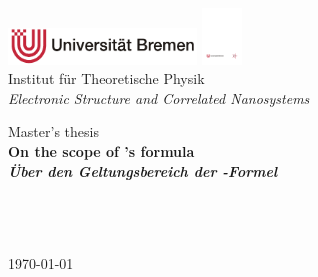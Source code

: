 

\begin{titlepage}
    \centering

    \normalsize
    \includegraphics[width=5cm]{figures/uni.pdf} \hfill
    \includegraphics[height=1.5cm]{figures/itp.pdf} \\
    \hfill Institut für Theoretische Physik \\
    \hfill \emph{Electronic Structure and Correlated Nanosystems}

    \vfill

    \Large
    Master's thesis \\[3pc]

    \Huge \bf
    On the scope of 's formula \\[3pc]

    \normalsize \it
    Über den Geltungsbereich der -Formel

    \vfill

    \large \normalfont
     \\[1pc]
     \\
     \\[2pc]

    \today

    \vfill
\end{titlepage}

\restoregeometry
